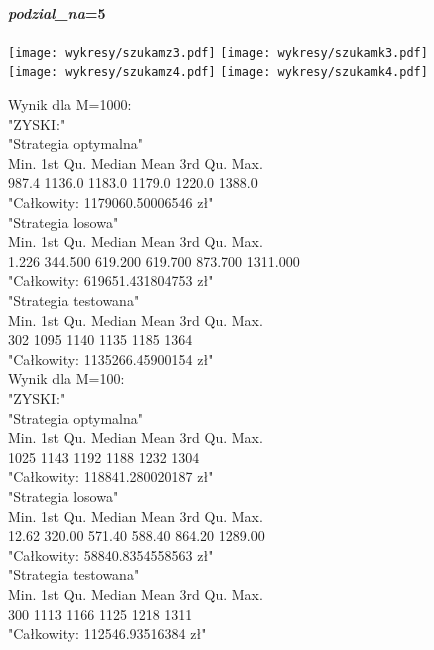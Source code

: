 \documentclass{article}
\begin{document}
 
 \paragraph{\textit{podzial\_na}=5} 
 \begin{center}
 \texttt{[image: wykresy/szukamz3.pdf]}
 \texttt{[image: wykresy/szukamk3.pdf]}
 \\
 \texttt{[image: wykresy/szukamz4.pdf]}
 \texttt{[image: wykresy/szukamk4.pdf]}
 \end{center}
 
Wynik dla M=1000:\\
"ZYSKI:"\\
"Strategia optymalna"\\
Min. 1st Qu.  Median    Mean 3rd Qu.    Max.  \\
987.4  1136.0  1183.0  1179.0  1220.0  1388.0  \\
"Całkowity:  1179060.50006546 zł" \\
"Strategia losowa" \\
Min.  1st Qu.   Median     Mean  3rd Qu.     Max.  \\
1.226  344.500  619.200  619.700  873.700 1311.000  \\
"Całkowity:  619651.431804753 zł" \\
"Strategia testowana" \\
Min. 1st Qu.  Median    Mean 3rd Qu.    Max.  \\
302    1095    1140    1135    1185    1364 \\ 
"Całkowity:  1135266.45900154 zł" \\

Wynik dla M=100:\\
"ZYSKI:" \\
"Strategia optymalna" \\
Min. 1st Qu.  Median    Mean 3rd Qu.    Max.  \\ 
1025    1143    1192    1188    1232    1304  \\
"Całkowity:  118841.280020187 zł" \\
"Strategia losowa" \\
Min. 1st Qu.  Median    Mean 3rd Qu.    Max.  \\
12.62  320.00  571.40  588.40  864.20 1289.00 \\ 
"Całkowity:  58840.8354558563 zł" \\
"Strategia testowana" \\
Min. 1st Qu.  Median    Mean 3rd Qu.    Max.  \\
300    1113    1166    1125    1218    1311 \\ 
"Całkowity:  112546.93516384 zł" \\
\end{document}
